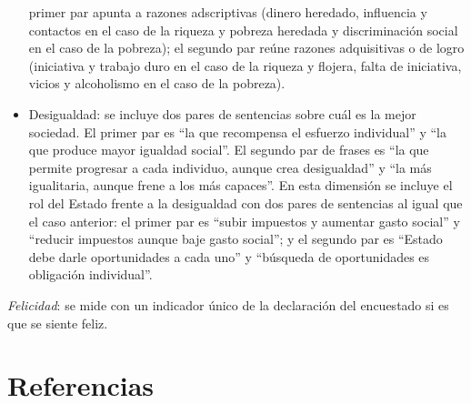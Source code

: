 \documentclass[
  12pt,
]{book}
\begin{document}
\begin{itemize}
  primer par apunta a razones adscriptivas (dinero heredado,
  influencia y contactos en el caso de la riqueza y pobreza heredada y
  discriminación social en el caso de la pobreza); el segundo par
  reúne razones adquisitivas o de logro (iniciativa y trabajo duro en
  el caso de la riqueza y flojera, falta de iniciativa, vicios y
  alcoholismo en el caso de la pobreza).
\item
  Desigualdad: se incluye dos pares de sentencias sobre cuál es la
  mejor sociedad. El primer par es ``la que recompensa el esfuerzo
  individual'' y ``la que produce mayor igualdad social''. El segundo par
  de frases es ``la que permite progresar a cada individuo, aunque crea
  desigualdad'' y ``la más igualitaria, aunque frene a los más capaces''.
  En esta dimensión se incluye el rol del Estado frente a la
  desigualdad con dos pares de sentencias al igual que el caso
  anterior: el primer par es ``subir impuestos y aumentar gasto social''
  y ``reducir impuestos aunque baje gasto social''; y el segundo par es
  ``Estado debe darle oportunidades a cada uno'' y ``búsqueda de
  oportunidades es obligación individual''.
\end{itemize}

\emph{Felicidad}: se mide con un indicador único de la declaración del
encuestado si es que se siente feliz.

\hypertarget{referencias-3}{%
\section{Referencias}\label{referencias-3}}
\end{document}

